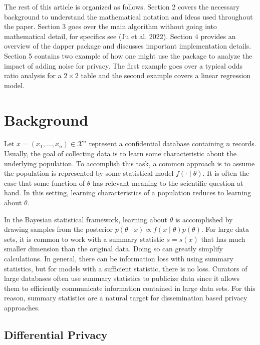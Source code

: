 The rest of this article is organized as follows. Section 2 covers the necessary background to understand the mathematical notation
and ideas used throughout the paper. Section 3 goes over the main algorithm without
going into mathematical detail, for specifics see (Ju et al. 2022). Section 4 provides
an overview of the dapper package and discusses important implementation details.
Section 5 contains two example of how one might use the package to analyze the
impact of adding noise for privacy. The first example goes over a typical
odds ratio analysis for a \(2 \times 2\) table and the second example
covers a linear regression model.

\hypertarget{background}{%
\section{Background}\label{background}}

Let \(x = (x_1, \ldots, x_n) \in \mathcal{X}^n\) represent a confidential
database containing \(n\) records. Usually, the goal of collecting data
is to learn some characteristic about the underlying population.
To accomplish this task, a common approach is to assume the population
is represented by some statistical model \(f( \cdot \mid \theta)\). It is often the case that
some function of \(\theta\) has relevant meaning to the scientific question at hand. In this setting,
learning characteristics of a population reduces to learning about \(\theta\).

In the Bayesian statistical framework, learning about \(\theta\) is accomplished by drawing samples from the
posterior \(p(\theta \mid x) \propto f(x \mid \theta) p(\theta)\). For
large data sets, it is common to work with a summary statistic \(s = s(x)\)
that has much smaller dimension than the original data. Doing so can
greatly simplify calculations. In general, there can be information
loss with using summary statistics, but for models with a sufficient
statistic, there is no loss. Curators of large databases
often use summary statistics to publicize data since it allows them
to efficiently communicate information contained in large data sets.
For this reason, summary statistics are a natural target for
dissemination based privacy approaches.

\hypertarget{differential-privacy}{%
\subsection{Differential Privacy}\label{differential-privacy}}

